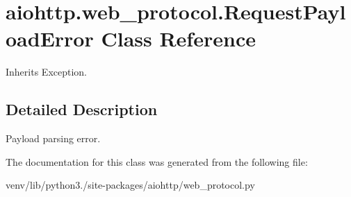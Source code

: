\hypertarget{classaiohttp_1_1web__protocol_1_1_request_payload_error}{}\section{aiohttp.\+web\+\_\+protocol.\+Request\+Payload\+Error Class Reference}
\label{classaiohttp_1_1web__protocol_1_1_request_payload_error}


Inherits Exception.



\subsection{Detailed Description}
\begin{DoxyVerb}Payload parsing error.\end{DoxyVerb}
 

The documentation for this class was generated from the following file\+:\begin{DoxyCompactItemize}
\item 
venv/lib/python3./site-\/packages/aiohttp/web\+\_\+protocol.\+py\end{DoxyCompactItemize}
